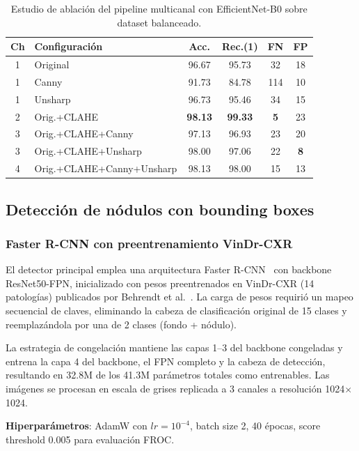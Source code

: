 \documentclass[conference]{IEEEtran}
\begin{document}
\begin{table}[!t]
\centering
\caption{Estudio de ablación del pipeline multicanal con EfficientNet-B0 sobre dataset balanceado.}
\label{tab:ablacion}
\renewcommand{\arraystretch}{1.1}
\begin{tabular}{clcccc}
\toprule
\textbf{Ch} & \textbf{Configuración} & \textbf{Acc.} & \textbf{Rec.(1)} & \textbf{FN} & \textbf{FP} \\
\midrule
1 & Original & 96.67 & 95.73 & 32 & 18 \\
1 & Canny & 91.73 & 84.78 & 114 & 10 \\
1 & Unsharp & 96.73 & 95.46 & 34 & 15 \\
2 & Orig.+CLAHE & \textbf{98.13} & \textbf{99.33} & \textbf{5} & 23 \\
3 & Orig.+CLAHE+Canny & 97.13 & 96.93 & 23 & 20 \\
3 & Orig.+CLAHE+Unsharp & 98.00 & 97.06 & 22 & \textbf{8} \\
4 & Orig.+CLAHE+Canny+Unsharp & 98.13 & 98.00 & 15 & 13 \\
\bottomrule
\end{tabular}
\end{table}

\subsection{Detección de nódulos con bounding boxes}

\subsubsection{Faster R-CNN con preentrenamiento VinDr-CXR}

El detector principal emplea una arquitectura Faster R-CNN~\cite{ren2015} con backbone ResNet50-FPN, inicializado con pesos preentrenados en VinDr-CXR (14 patologías) publicados por Behrendt et al.~\cite{behrendt2023}. La carga de pesos requirió un mapeo secuencial de claves, eliminando la cabeza de clasificación original de 15 clases y reemplazándola por una de 2 clases (fondo + nódulo).

La estrategia de congelación mantiene las capas 1--3 del backbone congeladas y entrena la capa 4 del backbone, el FPN completo y la cabeza de detección, resultando en 32.8M de los 41.3M parámetros totales como entrenables. Las imágenes se procesan en escala de grises replicada a 3 canales a resolución 1024$\times$1024.

\textbf{Hiperparámetros}: AdamW con $lr=10^{-4}$, batch size 2, 40 épocas, score threshold 0.005 para evaluación FROC.
\end{document}
